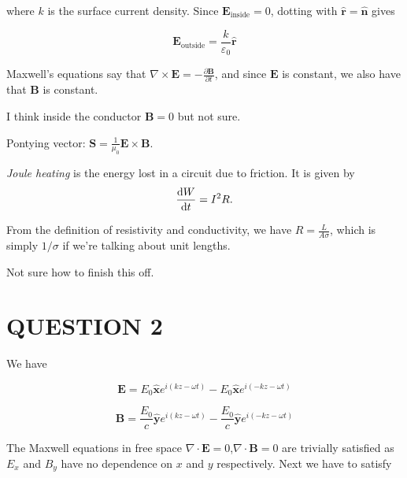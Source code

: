 \documentclass[a4paper]{article}
\begin{document}
where $ k $ is the surface current density. Since $ \mathbf{E}_{\text{inside}} = 0 $, dotting with $ \hat{\mathbf{r}} = \hat{\mathbf{n}} $ gives

\[ \mathbf{E}_{\text{outside}} = \frac{k}{\varepsilon_0} \hat{\mathbf{r}}
\]

Maxwell's equations say that $ \nabla \times \mathbf{E} = - \frac{\partial \mathbf{B} }{\partial t} $, and since $ \mathbf{E} $ is constant, we also have that $ \mathbf{B} $ is constant. 

I think inside the conductor $ \mathbf{B} = 0 $ but not sure.



Pontying vector: $ \mathbf{S} = \frac{1}{\mu_{0}} \mathbf{E} \times \mathbf{B}  $.

\begin{defi}
	\emph{Joule heating} is the energy lost in a circuit due to friction. It is given by
	\[
	\frac{\mathrm{d} W}{\mathrm{d} t} = I^2 R.
	\]
\end{defi}

From the definition of resistivity and conductivity, we have $ R = \frac{L}{A \sigma} $, which is simply $ 1/\sigma $ if we're talking about unit lengths.




Not sure how to finish this off. 


 

\section{QUESTION 2}

\begin{center}
\end{center}

We have

\[ \mathbf{E} = E_{0} \hat{\mathbf{x}} e^{i(kz - \omega t)} -  E_{0} \hat{\mathbf{x}} e^{i(-kz - \omega t)}   \]

\[ \mathbf{B} = \frac{E_{0}}{c} \hat{\mathbf{y}} e^{i(kz - \omega t)} -  \frac{E_{0}}{c} \hat{\mathbf{y}} e^{i(-kz - \omega t)}   \]

The Maxwell equations in free space $ \nabla \cdot \mathbf{E} = 0 $,$ \nabla  \cdot \mathbf{B} = 0  $ are trivially satisfied as $ E_{x} $ and $ B_{y} $ have no dependence on $ x $ and $ y $ respectively. Next we have to satisfy
\end{document}

